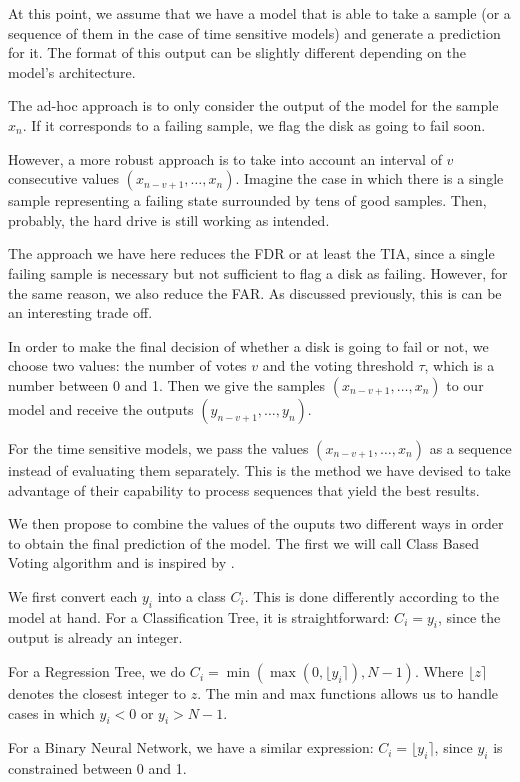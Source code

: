 At this point, we assume that we have a model that is able to take a sample (or a sequence of them in the case of time sensitive models) and generate a prediction for it.
The format of this output can be slightly different depending on the model's architecture.

The ad-hoc approach is to only consider the output of the model for the sample $x_n$.
If it corresponds to a failing sample, we flag the disk as going to fail soon.

However, a more robust approach is to take into account an interval of $v$ consecutive values $(x_{n-v+1},\dots,x_n)$.
Imagine the case in which there is a single sample representing a failing state surrounded by tens of good samples.
Then, probably, the hard drive is still working as intended.

The approach we have here reduces the FDR or at least the TIA, since a single failing sample is necessary but not sufficient to flag a disk as failing.
However, for the same reason, we also reduce the FAR.
As discussed previously, this is can be an interesting trade off.

In order to make the final decision of whether a disk is going to fail or not, we choose two values: the number of votes $v$ and the voting threshold $\tau$, which is a number between 0 and 1.
Then we give the samples $(x_{n-v+1},\dots,x_n)$ to our model and receive the outputs $(y_{n-v+1},\dots,y_n)$.

For the time sensitive models, we pass the values $(x_{n-v+1},\dots,x_n)$ as a sequence instead of evaluating them separately.
This is the method we have devised to take advantage of their capability to process sequences that yield the best results.

We then propose to combine the values of the ouputs two different ways in order to obtain the final prediction of the model.
The first we will call Class Based Voting algorithm and is inspired by \cite{Xu16}.

We first convert each $y_i$ into a class $C_i$.
This is done differently according to the model at hand.
For a Classification Tree, it is straightforward: $C_i = y_i$, since the output is already an integer.

For a Regression Tree, we do $C_i = \min(\max(0, \lfloor y_i \rceil), N-1)$.
Where $\lfloor z \rceil$ denotes the closest integer to $z$.
The min and max functions allows us to handle cases in which $y_i < 0$ or $y_i > N-1$.

For a Binary Neural Network, we have a similar expression: $C_i = \lfloor y_i \rceil$, since $y_i$ is constrained between 0 and 1.

